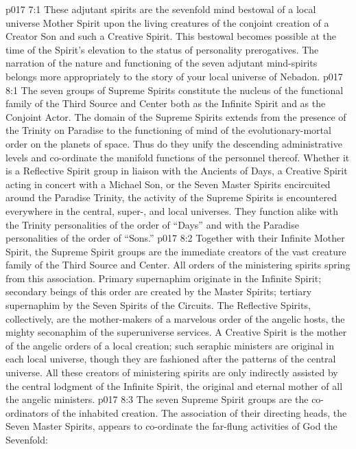 \vs p017 7:1 These adjutant spirits are the sevenfold mind bestowal of a local universe Mother Spirit upon the living creatures of the conjoint creation of a Creator Son and such a Creative Spirit. This bestowal becomes possible at the time of the Spirit’s elevation to the status of personality prerogatives. The narration of the nature and functioning of the seven adjutant mind\hyp{}spirits belongs more appropriately to the story of your local universe of Nebadon.
\vs p017 8:1 The seven groups of Supreme Spirits constitute the nucleus of the functional family of the Third Source and Center both as the Infinite Spirit and as the Conjoint Actor. The domain of the Supreme Spirits extends from the presence of the Trinity on Paradise to the functioning of mind of the evolutionary\hyp{}mortal order on the planets of space. Thus do they unify the descending administrative levels and co\hyp{}ordinate the manifold functions of the personnel thereof. Whether it is a Reflective Spirit group in liaison with the Ancients of Days, a Creative Spirit acting in concert with a Michael Son, or the Seven Master Spirits encircuited around the Paradise Trinity, the activity of the Supreme Spirits is encountered everywhere in the central, super-, and local universes. They function alike with the Trinity personalities of the order of “Days” and with the Paradise personalities of the order of “Sons.”
\vs p017 8:2 \pc Together with their Infinite Mother Spirit, the Supreme Spirit groups are the immediate creators of the vast creature family of the Third Source and Center. All orders of the ministering spirits spring from this association. Primary supernaphim originate in the Infinite Spirit; secondary beings of this order are created by the Master Spirits; tertiary supernaphim by the Seven Spirits of the Circuits. The Reflective Spirits, collectively, are the mother\hyp{}makers of a marvelous order of the angelic hosts, the mighty seconaphim of the superuniverse services. A Creative Spirit is the mother of the angelic orders of a local creation; such seraphic ministers are original in each local universe, though they are fashioned after the patterns of the central universe. All these creators of ministering spirits are only indirectly assisted by the central lodgment of the Infinite Spirit, the original and eternal mother of all the angelic ministers.
\vs p017 8:3 \pc The seven Supreme Spirit groups are the co\hyp{}ordinators of the inhabited creation. The association of their directing heads, the Seven Master Spirits, appears to co\hyp{}ordinate the far\hyp{}flung activities of God the Sevenfold:
